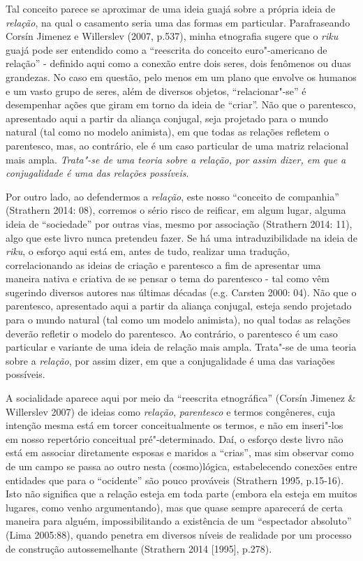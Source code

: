 Tal conceito parece se aproximar de uma ideia guajá sobre a própria
ideia de \emph{relação}, na qual o casamento seria uma das formas em
particular. Parafraseando Corsín Jimenez e Willerslev (2007, p.537),
minha etnografia sugere que o \emph{riku} guajá pode ser entendido como
a ``reescrita do conceito euro"-americano de relação'' - definido aqui como
a conexão entre dois seres, dois fenômenos ou duas grandezas. No caso em
questão, pelo menos em um plano que envolve os humanos e um vasto grupo
de seres, além de diversos objetos, ``relacionar"-se'' é desempenhar ações
que giram em torno da ideia de ``criar''. Não que o parentesco,
apresentado aqui a partir da aliança conjugal, seja projetado para o
mundo natural (tal como no modelo animista), em que todas as relações
refletem o parentesco, mas, ao contrário, ele é um caso particular de
uma matriz relacional mais ampla. \emph{Trata"-se de uma teoria sobre a
relação, por assim dizer, em que a conjugalidade é uma das relações
possíveis}.

Por outro lado, ao defendermos a \emph{relação}, este nosso ``conceito
de companhia'' (Strathern 2014: 08), corremos o sério risco de reificar,
em algum lugar, alguma ideia de ``sociedade'' por outras vias, mesmo por
associação (Strathern 2014: 11), algo que este livro nunca pretendeu
fazer. Se há uma intraduzibilidade na ideia de \emph{riku}, o esforço
aqui está em, antes de tudo, realizar uma tradução, correlacionando as
ideias de criação e parentesco a fim de apresentar uma maneira nativa e
criativa de se pensar o tema do parentesco - tal como vêm sugerindo
diversos autores nas últimas décadas (e.g. Carsten 2000: 04). Não que o
parentesco, apresentado aqui a partir da aliança conjugal, esteja sendo
projetado para o mundo natural (tal como um modelo animista), no qual
todas as relações deverão refletir o modelo do parentesco. Ao contrário,
o parentesco é um caso particular e variante de uma ideia de relação
mais ampla. Trata"-se de uma teoria sobre a \emph{relação}, por assim
dizer, em que a conjugalidade é uma das variações possíveis.

A socialidade aparece aqui por meio da ``reescrita etnográfica'' (Corsín
Jimenez \& Willerslev 2007) de ideias como \emph{relação},
\emph{parentesco} e termos congêneres, cuja intenção mesma está em
torcer conceitualmente os termos, e não em inseri"-los em nosso
repertório conceitual pré"-determinado. Daí, o esforço deste livro não
está em associar diretamente esposas e maridos a ``crias'', mas sim
observar como de um campo se passa ao outro nesta (cosmo)lógica,
estabelecendo conexões entre entidades que para o ``ocidente'' são pouco
prováveis (Strathern 1995, p.15-16). Isto não significa que a relação
esteja em toda parte (embora ela esteja em muitos lugares, como venho
argumentando), mas que quase sempre aparecerá de certa maneira para
alguém, impossibilitando a existência de um ``espectador absoluto'' (Lima
2005:88), quando penetra em diversos níveis de realidade por um processo
de construção autossemelhante (Strathern 2014 {[}1995{]}, p.278).


